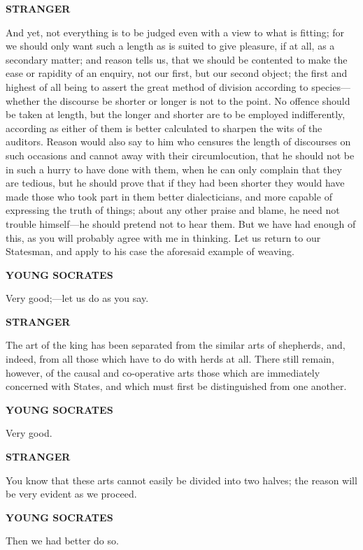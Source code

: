 \documentclass[11pt,letter]{article}
\begin{document}
\par \textbf{STRANGER}
\par   And yet, not everything is to be judged even with a view to what is fitting; for we should only want such a length as is suited to give pleasure, if at all, as a secondary matter; and reason tells us, that we should be contented to make the ease or rapidity of an enquiry, not our first, but our second object; the first and highest of all being to assert the great method of division according to species—whether the discourse be shorter or longer is not to the point. No offence should be taken at length, but the longer and shorter are to be employed indifferently, according as either of them is better calculated to sharpen the wits of the auditors. Reason would also say to him who censures the length of discourses on such occasions and cannot away with their circumlocution, that he should not be in such a hurry to have done with them, when he can only complain that they are tedious, but he should prove that if they had been shorter they would have made those who took part in them better dialecticians, and more capable of expressing the truth of things; about any other praise and blame, he need not trouble himself—he should pretend not to hear them. But we have had enough of this, as you will probably agree with me in thinking. Let us return to our Statesman, and apply to his case the aforesaid example of weaving.

\par \textbf{YOUNG SOCRATES}
\par   Very good;—let us do as you say.

\par \textbf{STRANGER}
\par   The art of the king has been separated from the similar arts of shepherds, and, indeed, from all those which have to do with herds at all. There still remain, however, of the causal and co-operative arts those which are immediately concerned with States, and which must first be distinguished from one another.

\par \textbf{YOUNG SOCRATES}
\par   Very good.

\par \textbf{STRANGER}
\par   You know that these arts cannot easily be divided into two halves; the reason will be very evident as we proceed.

\par \textbf{YOUNG SOCRATES}
\par   Then we had better do so.
\end{document}
